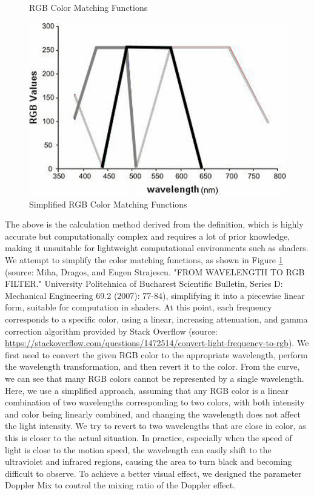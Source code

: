 \documentclass{article}
\begin{document}
\begin{figure}[htbp]
\begin{minipage}[b]{0.37\linewidth}
        \caption{RGB Color Matching Functions}
        \label{rgbcmf}
    \end{minipage}
    \begin{minipage}[b]{0.37\linewidth}
        \centering
        \includegraphics[width=\textwidth]{rgbsimp.png}
        \caption{Simplified RGB Color Matching Functions}
        \label{rgbsimp}
    \end{minipage}
\end{figure}

The above is the calculation method derived from the definition, which is highly accurate but computationally complex and requires a lot of prior knowledge, making it unsuitable for lightweight computational environments such as shaders. We attempt to simplify the color matching functions, as shown in Figure \ref{rgbsimp} (source: Miha, Dragos, and Eugen Strajescu. "FROM WAVELENGTH TO RGB FILTER." University Politehnica of Bucharest Scientific Bulletin, Series D: Mechanical Engineering 69.2 (2007): 77-84), simplifying it into a piecewise linear form, suitable for computation in shaders. At this point, each frequency corresponds to a specific color, using a linear, increasing attenuation, and gamma correction algorithm provided by Stack Overflow (source: \url{https://stackoverflow.com/questions/1472514/convert-light-frequency-to-rgb}). We first need to convert the given RGB color to the appropriate wavelength, perform the wavelength transformation, and then revert it to the color. From the curve, we can see that many RGB colors cannot be represented by a single wavelength. Here, we use a simplified approach, assuming that any RGB color is a linear combination of two wavelengths corresponding to two colors, with both intensity and color being linearly combined, and changing the wavelength does not affect the light intensity. We try to revert to two wavelengths that are close in color, as this is closer to the actual situation. In practice, especially when the speed of light is close to the motion speed, the wavelength can easily shift to the ultraviolet and infrared regions, causing the area to turn black and becoming difficult to observe. To achieve a better visual effect, we designed the parameter Doppler Mix to control the mixing ratio of the Doppler effect.
\end{document}
